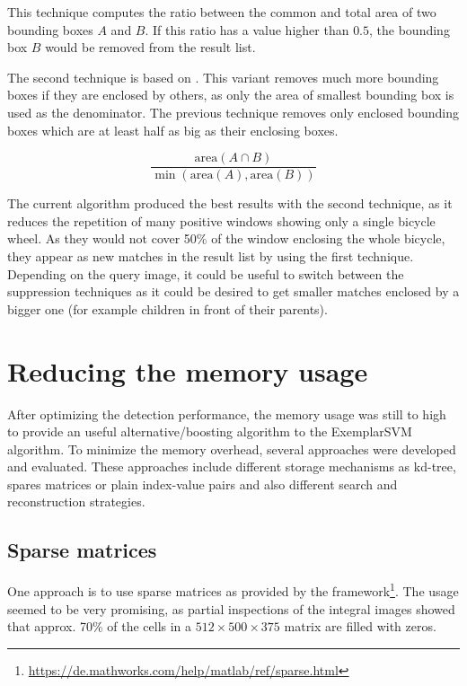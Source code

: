 This technique computes the ratio between the common and total area of two bounding boxes $A$ and $B$. If this ratio has a value higher than $0.5$, the bounding box $B$ would be removed from the result list.

The second technique is based on . This variant removes much more bounding boxes if they are enclosed by others, as only the area of smallest bounding box is used as the denominator. The previous technique removes only enclosed bounding boxes which are at least half as big as their enclosing boxes.

\begin{equation}
\frac{\text{area}(A \cap B)}{\min(\text{area}(A), \text{area}(B))}
\label{eqn:nonmax_min}
\end{equation}

The current algorithm produced the best results with the second technique, as it reduces the repetition of many positive windows showing only a single bicycle wheel. As they would not cover 50\% of the window enclosing the whole bicycle, they appear as new matches in the result list by using the first technique. Depending on the query image, it could be useful to switch between the suppression techniques as it could be desired to get smaller matches enclosed by a bigger one (for example children in front of their parents).

\section{Reducing the memory usage}

After optimizing the detection performance, the memory usage was still to high to provide an useful alternative/boosting algorithm to the ExemplarSVM algorithm. To minimize the memory overhead, several approaches were developed and evaluated. These approaches include different storage mechanisms as kd-tree, spares matrices or plain index-value pairs and also different search and reconstruction strategies.

\subsection{Sparse matrices}

One approach is to use sparse matrices as provided by the \MATLAB framework\footnote{\url{https://de.mathworks.com/help/matlab/ref/sparse.html}}. The usage seemed to be very promising, as partial inspections of the integral images showed that approx. 70\% of the cells in a $512\times500\times375$ matrix are filled with zeros.

